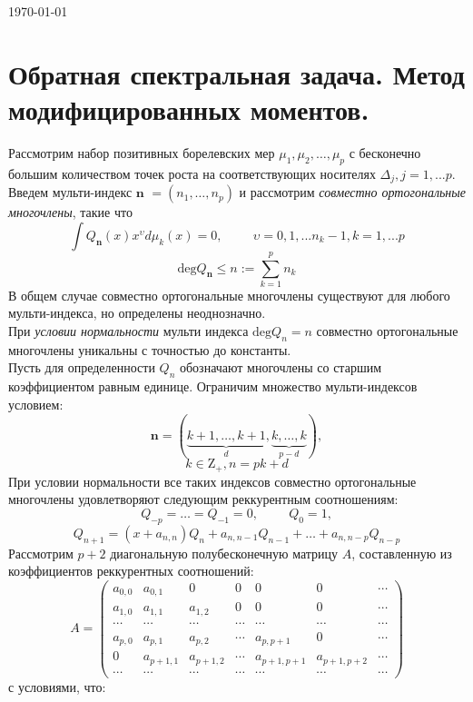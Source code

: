 \documentclass{report}
\begin{document}
\begin{flushright}
\today
\tableofcontents
\end{flushright}

\chapter {Обратная спектральная задача. Метод модифицированных моментов.}
Рассмотрим набор позитивных борелевских мер
$\mu_1,\mu_2,\ldots,\mu_p$ с бесконечно большим количеством точек
роста на соответствующих носителях
$\Delta_j, j=1,...p$. \\
Введем мульти-индекс $\textbf{n}$ $=(n_1,\ldots,n_p)$ и рассмотрим \emph {совместно ортогональные многочлены}, такие что
$$
\int Q_{ \textbf {n} } (x) x^{\upsilon} d\mu_k(x) = 0, \hspace{1cm} \upsilon = 0,1,... n_k-1, k = 1, ... p 
$$
$$\mbox{deg} Q_{ \textbf {n} } \leq n := \sum\limits_{k=1}^{p} n_k$$
В общем случае совместно ортогональные многочлены существуют для любого мульти-индекса, но определены неоднозначно. \\
При \emph {условии нормальности} мульти индекса $\mbox{deg}Q_n=n$ совместно ортогональные многочлены уникальны с точностью до константы. \\
Пусть для определенности $Q_n$ обозначают многочлены со старшим коэффициентом равным единице. Ограничим множество мульти-индексов условием:
$$\textbf {n} =(\underbrace{k+1,\ldots,k+1}_{d},\underbrace{k,\ldots,k}_{p-d}),$$ $$k\in{\mbox{Z}}_{+},n=pk+d $$
При условии нормальности все таких индексов совместно ортогональные многочлены удовлетворяют следующим реккурентным соотношениям:
$$
Q_{-p}=\ldots=Q_{-1}=0, \hspace{1cm} Q_0=1,
$$
$$
Q_{n+1}=(x+a_{n,n})Q_n+a_{n,n-1}Q_{n-1}+\ldots + a_{n,n-p}Q_{n-p}
$$
Рассмотрим $p+2$ диагональную полубесконечную матрицу $A$, составленную из коэффициентов реккурентных соотношений:
$$
A= \left(\begin{array}{ccccccc}
a_{0,0}&a_{0,1}&0&0&0&0&\cdots\\
a_{1,0}&a_{1,1}&a_{1,2}&0&0&0&\cdots\\
\cdots&\cdots&\cdots&\cdots&\cdots&\cdots&\cdots\\
a_{p,0}&a_{p,1}&a_{p,2}&\cdots&a_{p,p+1}&0&\cdots\\
0&a_{p+1,1}&a_{p+1,2}&\cdots&a_{p+1,p+1}&a_{p+1,p+2}&\cdots\\
\cdots&\cdots&\cdots&\cdots&\cdots&\cdots&\cdots
\end{array}\right)
$$  
с условиями, что:
\end{document}
